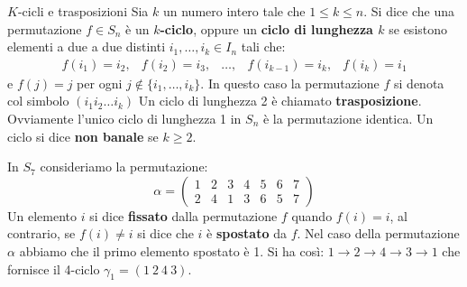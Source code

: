 \begin{defbox}{$K$-cicli e trasposizioni}
	Sia $k$ un numero intero tale che $1\leq k \leq n$. Si dice che una permutazione $f \in S_{n}$ è un \textbf{$k$-ciclo}, oppure un \textbf{ciclo di lunghezza $k$} se esistono elementi a due a due distinti $i_{1},\ldots,i_{k} \in I_{n}$ tali che:
	\begin{displaymath}
		\begin{array}{lllll}
			f(i_{1})=i_{2}, & f(i_{2})=i_{3}, & \ldots ,& f(i_{k-1})=i_{k}, & f(i_{k})=i_{1}
		\end{array}
	\end{displaymath}
	e $f(j)=j$ per ogni $j \notin \{i_{1},\ldots,i_{k}\}$. In questo caso la permutazione $f$ si denota col simbolo $(i_{1}i_{2}\ldots i_{k})$ Un ciclo di lunghezza 2 è chiamato \textbf{trasposizione}. Ovviamente l'unico ciclo di lunghezza 1 in $S_{n}$ è la permutazione identica. Un ciclo si dice \textbf{non banale} se $k \geq 2$.
\end{defbox}

\begin{example}
	In $S_{7}$ consideriamo la permutazione:
	\begin{displaymath}
		\alpha = \left( \begin{array}{ccccccc}
			1 & 2 & 3 & 4 & 5 & 6 & 7 \\
			2 & 4 & 1 & 3 & 6 & 5 & 7
		\end{array}\right)
	\end{displaymath}
	Un elemento $i$ si dice \textbf{fissato} dalla permutazione $f$ quando $f(i) = i$, al contrario, se $f(i)\neq i$ si dice che $i$ è \textbf{spostato} da $f$. Nel caso della permutazione $\alpha$ abbiamo che il primo elemento spostato è 1. Si ha così: $1 \rightarrow 2 \rightarrow 4 \rightarrow 3 \rightarrow 1$ che fornisce il 4-ciclo $\gamma_{1}=(1 \ 2 \ 4 \ 3)$.
\end{example}

